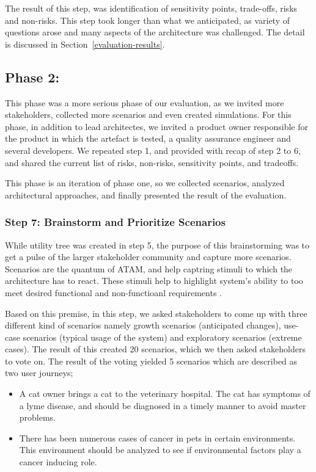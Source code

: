 \documentclass{bmcart}
\begin{document}
The result of this step, was identification of sensitivity points, trade-offs, risks and non-risks. This step took longer than what we anticipated, as variety of questions arose and many aspects of the architecture was challenged. The detail is discussed in Section~\ref{evaluation-results}. 
 

\subsection{Phase 2:}

This phase was a more serious phase of our evaluation, as we invited more stakeholders, collected more scenarios and even created simulations. For this phase, in addition to lead architectes, we invited a product owner responsible for the product in which the artefact is tested, a quality assurance engineer and several developers. We repeated step 1, and provided with recap of step 2 to 6, and shared the current list of risks, non-risks, sensitivity points, and tradeoffs. 

This phase is an iteration of phase one, so we collected scenarios, analyzed architectural approaches, and finally presented the result of the evaluation. 

\subsubsection{Step 7: Brainstorm and Prioritize Scenarios}

While utility tree was created in step 5, the purpose of this brainstorming was to get a pulse of the larger stakeholder community and capture more scenarios. Scenarios are the quantum of ATAM, and help captring stimuli to which the architecture has to react. These stimuli help to highlight system's ability to too meet desired functional and non-functioanl requirements \cite{KazmanATAM}. 

Based on this premise, in this step, we asked stakeholders to come up with three different kind of scenarios namely growth scenarios (anticipated changes), use-case scenarios (typical usage of the system) and exploratory scenarios (extreme cases). The result of this created 20 scenarios, which we then asked stakeholders to vote on. The result of the voting yielded 5 scenarios which are described as two user journeys;

\begin{itemize}
    \item A cat owner brings a cat to the veterinary hospital. The cat has symptoms of a lyme disease, and should be diagnosed in a timely manner to avoid master problems.
    \item There has been numerous cases of cancer in pets in certain environments. This environment should be analyzed to see if environmental factors play a cancer inducing role.
\end{itemize}
\end{document}
